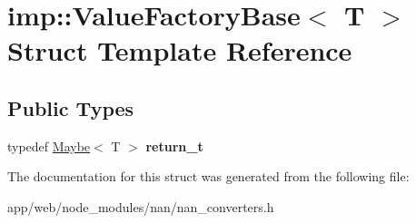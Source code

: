 \hypertarget{structimp_1_1_value_factory_base}{}\section{imp\+:\+:Value\+Factory\+Base$<$ T $>$ Struct Template Reference}
\label{structimp_1_1_value_factory_base}
\subsection*{Public Types}
\begin{DoxyCompactItemize}
\item 
\mbox{\label{structimp_1_1_value_factory_base_a06e8be3474b7d8434ca343b3d0e1830f}} 
typedef \hyperlink{class_maybe}{Maybe}$<$ T $>$ {\bfseries return\+\_\+t}
\end{DoxyCompactItemize}


The documentation for this struct was generated from the following file\+:\begin{DoxyCompactItemize}
\item 
app/web/node\+\_\+modules/nan/nan\+\_\+converters.\+h\end{DoxyCompactItemize}
